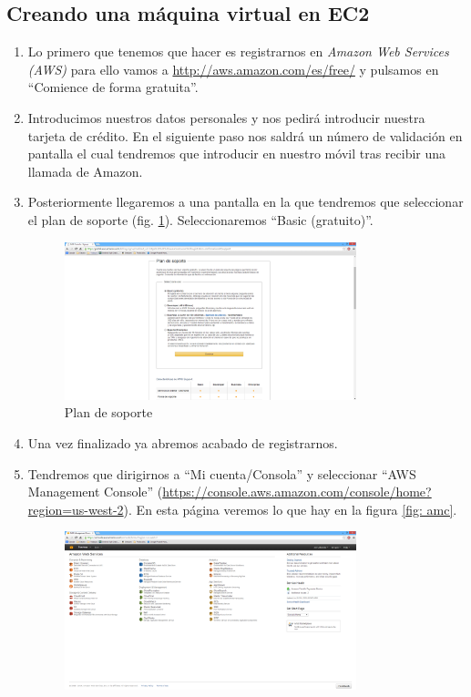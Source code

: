 \documentclass[a4paper,10pt]{scrartcl}
\begin{document}
\subsection{Creando una máquina virtual en EC2}
\begin{enumerate}
	\item Lo primero que tenemos que hacer es registrarnos en \emph{Amazon Web Services (AWS)} para ello vamos a \url{http://aws.amazon.com/es/free/} y pulsamos en ``Comience de forma gratuita''. 
	\item Introducimos nuestros datos personales y nos pedirá introducir nuestra tarjeta de crédito. En el siguiente paso nos saldrá un número de validación en pantalla el cual tendremos que introducir en nuestro móvil tras recibir una llamada de Amazon. 
	\item Posteriormente llegaremos a una pantalla en la que tendremos que seleccionar el plan de soporte (fig. \ref{fig:plan_soporte}). Seleccionaremos ``Basic (gratuito)''.
	\begin{figure}[htb!]
		\centering
		\includegraphics[width=0.8\textwidth] {plan_soporte.png}
		\caption{Plan de soporte}
		\label{fig:plan_soporte}
	\end{figure}
	\item Una vez finalizado ya abremos acabado de registrarnos.
	\item Tendremos que dirigirnos a ``Mi cuenta/Consola'' y seleccionar ``AWS Management Console'' (\url{https://console.aws.amazon.com/console/home?region=us-west-2}). En esta página veremos lo que hay en la figura \ref{fig: amc}.
	\begin{figure}[htb!]
		\centering
		\includegraphics[width=0.8\textwidth] {amc.png}

\end{figure}
\end{enumerate}
\end{document}
